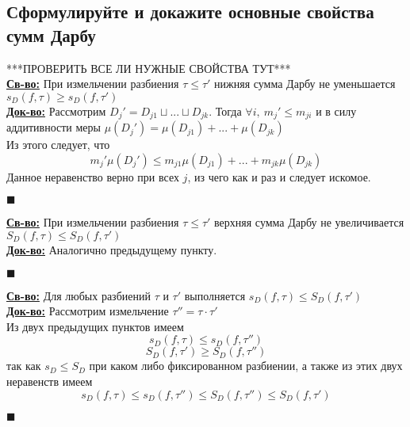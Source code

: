 
\subsection{Сформулируйте и докажите основные свойства сумм Дарбу}

***ПРОВЕРИТЬ ВСЕ ЛИ НУЖНЫЕ СВОЙСТВА ТУТ***\\
\textbf{\underline{Св-во:} } При измельчении разбиения $\tau \leq \tau'$ нижняя сумма Дарбу не уменьшается $s_D(f, \tau) \geq s_D(f, \tau')$ \\
\textbf{\underline{Док-во:} } Рассмотрим $D_j' = D_{j1}\sqcup ... \sqcup D_{jk}$. Тогда $\forall i, \ m_j' \leq m_{ji}$ и в силу аддитивности меры $\mu(D_j') = \mu(D_{j1}) + ... + \mu(D_{jk}) $ \\
Из этого следует, что 
\[m_j'\mu(D_j') \leq m_{j1}\mu(D_{j1}) + ... + m_{jk}\mu(D_{jk})\]
Данное неравенство верно при всех $j$, из чего как и раз и следует искомое. \begin{flushright}
$\blacksquare$
\end{flushright}
\textbf{\underline{Св-во:} } При измельчении разбиения $\tau \leq \tau'$ верхняя сумма Дарбу не увеличивается $S_D(f, \tau) \leq S_D(f, \tau')$ \\
\textbf{\underline{Док-во:} } Аналогично предыдущему пункту.
\begin{flushright}
$\blacksquare$
\end{flushright}
\textbf{\underline{Св-во:} } Для любых разбиений $\tau$ и $\tau'$ выполняется $s_D(f, \tau) \leq S_D(f, \tau')$\\
\textbf{\underline{Док-во:} } Рассмотрим измельчение $\tau'' = \tau\cdot\tau'$ \\
Из двух предыдущих пунктов имеем 
\[s_D(f, \tau) \leq s_D(f, \tau'')\]
\[S_D(f, \tau') \geq S_D(f, \tau'')\]
так как $s_D \leq S_D$ при каком либо фиксированном разбиении, а также из этих двух неравенств имеем
\[s_D(f, \tau) \leq s_D(f, \tau'') \leq S_D(f, \tau'') \leq S_D(f, \tau')\]
\begin{flushright}
$\blacksquare$
\end{flushright}

